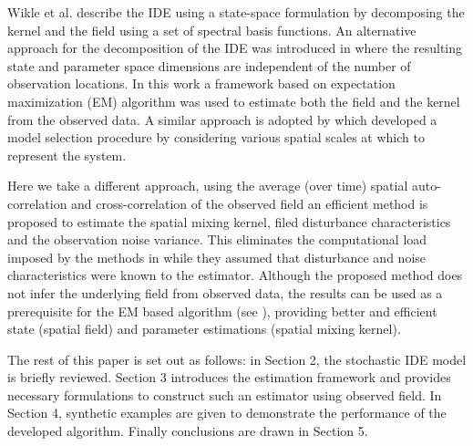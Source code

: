\documentclass[10pt,twocolumn,twoside]{IEEEtran}
\begin{document}
Wikle et al. \cite{Wikle2002} describe the IDE using a state-space formulation by decomposing the kernel and the field using a set of spectral basis functions. An alternative approach for the decomposition of the IDE was introduced in \cite{Dewar2009} where the resulting state and parameter space dimensions are independent of the number of observation locations. In this work a framework based on expectation maximization (EM)  algorithm \cite{Dempster1977,Gibsona2005}  was used to estimate both the field and the kernel from the observed data. A similar approach is adopted by \cite{Scerri2009} which developed a model selection procedure by considering various spatial scales at which to represent the system.  

Here we take a different approach, using the average (over time) spatial auto-correlation and cross-correlation  of the observed field an efficient method is proposed to estimate the spatial mixing kernel, filed disturbance characteristics and the observation noise variance. This eliminates the computational load imposed by the methods in \cite{Dewar2009,Scerri2009} while they assumed that disturbance and noise characteristics were known to the estimator. Although the proposed method does not infer the underlying field from observed data, the results can be used as a prerequisite for the EM based algorithm (see \cite{Dewar2009,Xu2007}), providing better and efficient state (spatial field) and parameter estimations (spatial mixing kernel). 

The rest of this paper is set out as follows: in Section 2, the stochastic IDE model is briefly reviewed. Section 3 introduces the estimation framework and provides necessary formulations  to construct such an estimator using observed field. In Section 4, synthetic examples are given to demonstrate the performance of the developed algorithm. Finally conclusions are drawn in Section 5.





 

\end{document}
